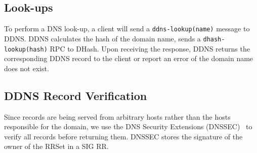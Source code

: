 \subsection{Look-ups}

To perform a DNS look-up, a client will send a 
{\tt ddns-lookup(name)} message to {DDNS}.
DDNS 
calculates the hash of the domain name, sends a
{\tt dhash-lookup(hash)} RPC to DHash. Upon receiving
the response, DDNS returns the corresponding DDNS record to the 
client or report an error of the domain name does 
not exist.

\subsection{DDNS Record Verification}

Since records are being served from arbitrary hosts rather
than the hosts responsible for the domain, 
we use the DNS Security Extensions (DNSSEC)~\cite{dnssec:rfc} to
verify all records before returning them. DNSSEC stores the 
signature of the owner of the RRSet in a 
SIG RR.
